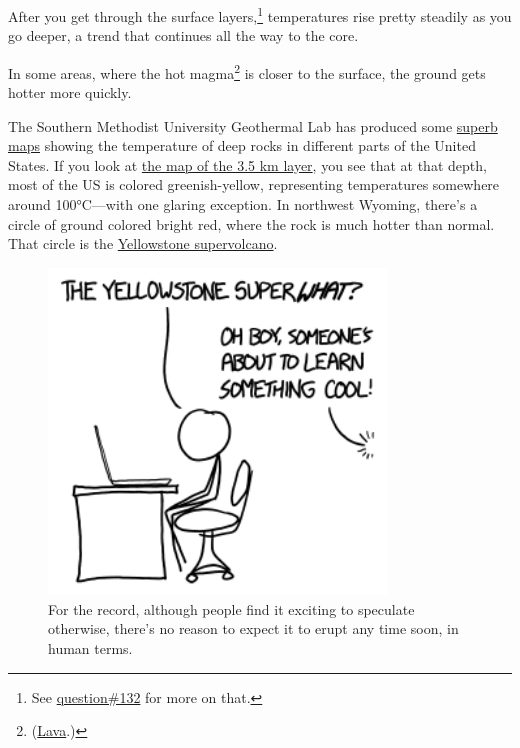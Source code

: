 {{After you get through the surface layers,{\footnote{See \href{http://what-if.xkcd.com/132/}{question\#132} for more on that.} } temperatures rise pretty steadily as you go deeper, a trend that continues all the way to the core.}

{In some areas, where the hot magma{\footnote{(\href{http://xkcd.com/1405/}{Lava}.)} } is closer to the surface, the ground gets hotter more quickly.}

{The Southern Methodist University Geothermal Lab has produced some \href{http://www.smu.edu/Dedman/Academics/Programs/GeothermalLab/DataMaps/TemperatureMaps}{superb maps} showing the temperature of deep rocks in different parts of the United States. If you look at \href{http://www.smu.edu/\~/media/Site/Dedman/Academics/Programs/Geothermal\%20Lab/Graphics/TemperatureMaps/SMU\_2011\_35kmTemperature.ashx?la=en}{the map of the 3.5 km layer}, you see that at that depth, most of the US is colored greenish-yellow, representing temperatures somewhere around 100°C—with one glaring exception. In northwest Wyoming, there's a circle of ground colored bright red, where the rock is much hotter than normal. That circle is the \href{http://en.wikipedia.org/wiki/Yellowstone\_Caldera} {Yellowstone supervolcano}.}

\begin{figure}[!htbp]
\centering
\includegraphics[scale=0.5, max width=0.8\textwidth]{imgs/a/135/what.png}
\caption{For the record, although people find it exciting to speculate otherwise, there's no reason to expect it to erupt any time soon, in human terms.}
\end{figure}

}
